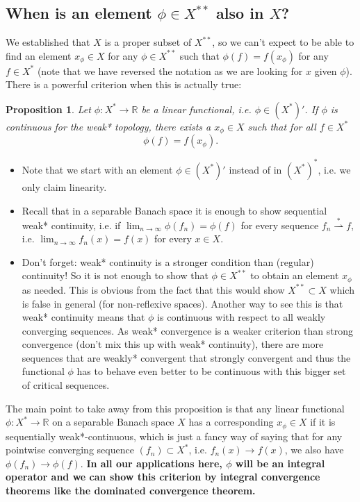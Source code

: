 \documentclass{scrartcl}
\newtheorem{prop}{Proposition}
\theoremstyle{definition}
\theoremstyle{remark}
\newcommand{\R}{\mathbb R}
\begin{document}
{\subsection*{When is an element $\phi\in X^{**}$ also in $X$?}
We established that $X$ is a proper subset of $X^{**}$, so we can't expect to be able to find an element $x_\phi\in X$ for any $\phi \in X^{**}$ such that $\phi(f) = f(x_\phi)$ for any $f\in X^*$ (note that we have reversed the notation as we are looking for $x$ given $\phi$). There is a powerful criterion when this is actually true:
\begin{prop}
Let $\phi : X^*\to \R$ be a linear functional, i.e. $\phi\in (X^*)'$. If $\phi$ is continuous for the weak* topology, there exists a $x_\phi\in X$ such that for all $f\in X^*$
\[\phi(f) = f(x_\phi).\]
\end{prop}
\begin{itemize}
\item Note that we start with an element $\phi \in (X^*)'$ instead of in $(X^*)^*$, i.e. we only claim linearity.
\item Recall that in a separable Banach space it is enough to show sequential weak* continuity, i.e. if $\lim_{n\to \infty}\phi(f_n) = \phi(f)$ for every sequence $f_n \stackrel {*}{\rightharpoonup} f$, i.e. $\lim_{n\to\infty} f_n(x) = f(x)$ for every $x\in X$.
\item Don't forget: weak* continuity is a stronger condition than (regular) continuity! So it is not enough to show that $\phi\in X^{**}$ to obtain an element $x_\phi$ as needed. This is obvious from the fact that this would show $X^{**} \subset X$ which is false in general (for non-reflexive spaces). Another way to see this is that weak* continuity means that $\phi$ is continuous with respect to all weakly converging sequences. As weak* convergence is a weaker criterion than strong convergence (don't mix this up with weak* continuity), there are more sequences that are weakly* convergent that strongly convergent and thus the functional $\phi$ has to behave even better to be continuous with this bigger set of critical sequences.
\end{itemize}
The main point to take away from this proposition is that any linear functional $\phi : X^{*}\to \R$ on a separable Banach space $X$ has a corresponding $x_\phi\in X$ if it is sequentially weak*-continuous, which is just a fancy way of saying that for any pointwise converging sequence $(f_n)\subset X^*$, i.e. $f_n(x) \to f(x)$, we also have $\phi(f_n) \to \phi(f)$. \textbf{In all our applications here, $\phi$ will be an integral operator and we can show this criterion by integral convergence theorems like the dominated convergence theorem.}  
}
\end{document}
